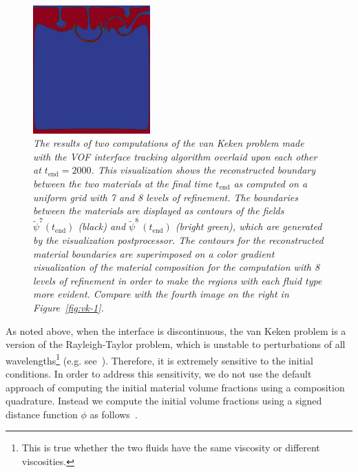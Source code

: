 \begin{figure}
    \centering
    \includegraphics[width=0.4\textwidth]{cookbooks/van-keken-vof/doc/vof_van_keken_refinement_comparison.png}
    \caption{\it The results of two computations of the van Keken problem made with the VOF 
        interface tracking algorithm overlaid upon each other at $t_\text{end}=2000$.
        This visualization shows the reconstructed boundary between the two
        materials at the final time $t_\text{end}$ as computed on a uniform grid
        with 7 and 8 levels of refinement.
        The boundaries between the materials are displayed as contours
        of the fields $\tilde{\psi}^7(t_\text{end})$ (black) and
        $\tilde{\psi}^8\,(t_\text{end})$ (bright green), which are generated by the  visualization postprocessor.
        The contours for the reconstructed material boundaries are superimposed
        on a color gradient visualization of the material composition for the
        computation with 8 levels of refinement in order to make the regions
        with each fluid type more evident.
        Compare with the fourth image on the right in Figure~\ref{fig:vk-1}.
    }
    \label{fig:VOF_van_Keken-02}
\end{figure}

As noted above, when the interface is discontinuous, the van Keken problem is a version 
of the Rayleigh-Taylor problem, which is unstable to perturbations of all 
wavelengths\footnote{This is true whether the two fluids have the same viscosity or different 
viscosities.} (e.g. see~\cite{SC:1961}).
Therefore, it is extremely sensitive to the initial conditions.
In order to address this sensitivity, we do not use  the default approach of
computing the initial material volume fractions using a composition quadrature.
Instead we compute the initial volume fractions using a signed distance
function $\phi$ as follows~\cite{JMR:2019,JMR-EGP:2019}.

